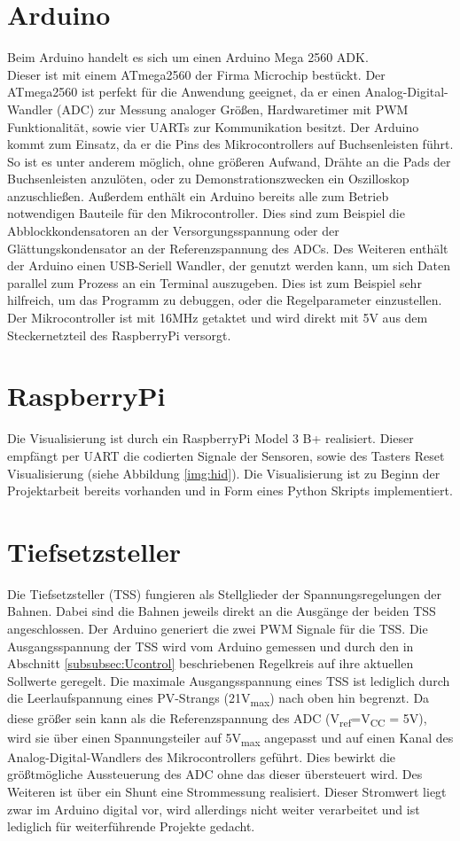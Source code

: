 \documentclass[a4paper, 11pt]{report}
\begin{document}
	\section{Arduino}
		Beim Arduino handelt es sich um einen Arduino Mega 2560 ADK.\\
		Dieser ist mit einem ATmega2560 der Firma Microchip bestückt.
		Der ATmega2560 ist perfekt für die Anwendung geeignet, da er einen Analog-Digital-Wandler (ADC) zur Messung analoger Größen, Hardwaretimer mit PWM Funktionalität, sowie  vier UARTs zur Kommunikation besitzt.
Der Arduino kommt zum Einsatz, da er die Pins des Mikrocontrollers auf Buchsenleisten führt. So ist es unter anderem möglich, ohne größeren Aufwand, Drähte an die Pads der Buchsenleisten anzulöten, oder zu Demonstrationszwecken ein Oszilloskop anzuschließen. Außerdem enthält ein Arduino bereits alle zum Betrieb notwendigen Bauteile für den Mikrocontroller.
Dies sind zum Beispiel die Abblockkondensatoren an der Versorgungsspannung oder der Glättungskondensator an der Referenzspannung des ADCs.
Des Weiteren enthält der Arduino einen USB-Seriell Wandler, der genutzt werden kann, um sich Daten parallel zum Prozess an ein Terminal auszugeben.
Dies ist zum Beispiel sehr hilfreich, um das Programm zu debuggen, oder die Regelparameter einzustellen.
Der Mikrocontroller ist mit 16MHz getaktet und wird direkt mit 5V aus dem Steckernetzteil des RaspberryPi versorgt.
	\section{RaspberryPi}
		Die Visualisierung ist durch ein RaspberryPi Model 3 B+ realisiert. Dieser empfängt per UART die codierten Signale der Sensoren, sowie des Tasters \glqq Reset Visualisierung\grqq{} (siehe Abbildung \ref{img:hid}).
		Die Visualisierung ist zu Beginn der Projektarbeit bereits vorhanden und in Form eines Python Skripts implementiert.
	\section{Tiefsetzsteller}
		Die Tiefsetzsteller (TSS) fungieren als Stellglieder der Spannungsregelungen der Bahnen.
		Dabei sind die Bahnen jeweils direkt an die Ausgänge der beiden TSS angeschlossen.
	  Der Arduino generiert die zwei PWM Signale für die TSS.
		Die Ausgangsspannung der TSS wird vom Arduino gemessen und durch den in Abschnitt \ref{subsubsec:Ucontrol} beschriebenen Regelkreis auf ihre aktuellen Sollwerte geregelt.
		Die maximale Ausgangsspannung eines TSS ist lediglich durch die Leerlaufspannung eines PV-Strangs (21V\textsubscript{max})
		nach oben hin begrenzt.
		Da diese größer sein kann als die Referenzspannung des ADC (V\textsubscript{ref}=V\textsubscript{CC} = 5V), wird sie über einen Spannungsteiler auf 5V\textsubscript{max} angepasst und auf einen Kanal des Analog-Digital-Wandlers des Mikrocontrollers geführt. Dies bewirkt die größtmögliche Aussteuerung des ADC ohne das dieser übersteuert wird.
		Des Weiteren ist über ein Shunt eine Strommessung realisiert.
		Dieser Stromwert liegt zwar im Arduino digital vor, wird allerdings nicht weiter
		verarbeitet und ist lediglich für weiterführende Projekte gedacht.
\end{document}
